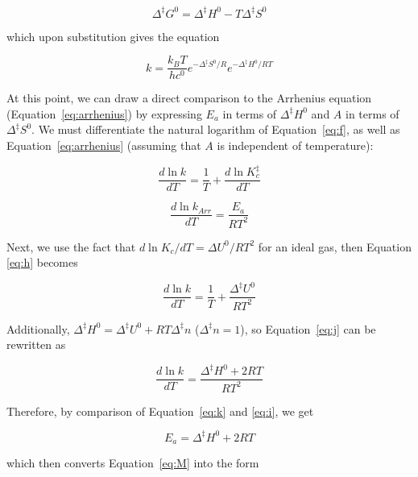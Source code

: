 \begin{doublespace}
\begin{equation}
  \Delta^\ddagger G^0 = \Delta^\ddagger H^0 - T \Delta^\ddagger S^0
\end{equation}

\noindent which upon substitution gives the equation

\begin{equation}
  k = \frac{k_B T}{hc^0} e^{-\Delta^\ddagger S^0/R} e^{-\Delta^\ddagger H^0/RT}
\label{eq:M}
\end{equation}

At this point, we can draw a direct comparison to the Arrhenius equation
(Equation~\ref{eq:arrhenius}) by expressing $E_a$ in terms of $\Delta^\ddagger
H^0$ and $A$ in terms of $\Delta^\ddagger S^0$.  We must differentiate the
natural logarithm of Equation~\ref{eq:f}, as well as
Equation~\ref{eq:arrhenius} (assuming that $A$ is independent of temperature):

\begin{equation}
  \frac{d \ln k}{dT} = \frac{1}{T} + \frac{d \ln K_c^\ddagger}{dT}
  \label{eq:h}
\end{equation}

\begin{equation}
  \frac{d \ln k_{Arr}}{dT} = \frac{E_a}{RT^2}
  \label{eq:i}
\end{equation}

\noindent Next, we use the fact that $d \ln K_c / dT = \Delta U^0/RT^2$ for an
ideal gas, then Equation \ref{eq:h}  becomes

\begin{equation}
  \frac{d \ln k}{dT} = \frac{1}{T} + \frac{\Delta ^\ddagger U^0}{RT^2}
  \label{eq:j}
\end{equation}

\noindent Additionally, $\Delta ^\ddagger H^0 = \Delta ^\ddagger U^0 + RT
\Delta^\ddagger n$ ($\Delta^\ddagger n = 1$), so Equation~\ref{eq:j} can be
rewritten as

\begin{equation}
  \frac{d \ln k}{dT} = \frac{\Delta ^\ddagger H^0 + 2RT}{RT^2}
  \label{eq:k}
\end{equation}

\noindent Therefore, by comparison of Equation~\ref{eq:k} and \ref{eq:i}, we
get

\begin{equation}
  E_a = \Delta^\ddagger H^0 + 2RT
  \label{eq:Ea-vs-dH}
\end{equation}

\noindent which then converts Equation~\ref{eq:M} into the form


\end{doublespace}
